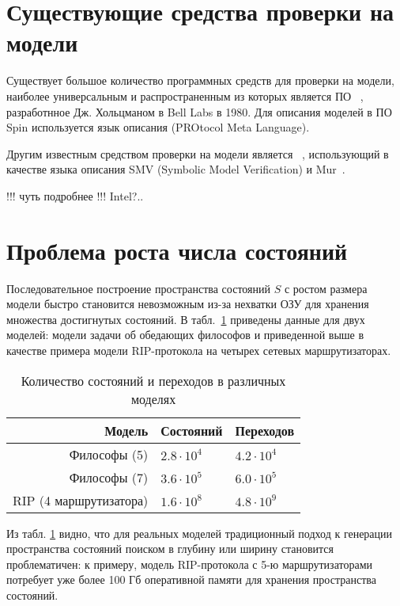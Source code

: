 \documentclass[a4paper,notitlepage,14pt]{article}
\begin{document}
\section{Существующие средства проверки на модели}
\label{sec:existing-tools}

Существует большое количество программных средств для проверки на модели, наиболее
универсальным и распространенным из которых является ПО ~\cite{SpinRoot},
разработнное Дж. Хольцманом в Bell Labs в 1980. Для описания моделей в ПО Spin
используется язык описания  (PROtocol Meta Language).

Другим известным средством проверки на модели является
~\cite{Cimatti00nusmv:a}, использующий в качестве языка описания SMV (Symbolic
Model Verification) и Mur\phi~\cite{Dill96murphi}.

!!! чуть подробнее
!!! Intel?..

\section{Проблема роста числа состояний}
\label{sec:state-explosion}

Последовательное построение пространства состояний $S$ с ростом размера модели быстро
становится невозможным из-за нехватки ОЗУ для хранения множества достигнутых состояний. В
табл.~\ref{tab:models-statecount} приведены данные для двух моделей: модели задачи об
обедающих философов и приведенной выше в качестве примера модели RIP-протокола на четырех
сетевых маршрутизаторах.

\begin{table}
  \centering
  \begin{tabular}{|r|l|l|}
    \hline
    Модель                  & Состояний         & Переходов       \\
    \hline
    Философы (5)            & $2.8 \cdot 10^4$  & $4.2 \cdot 10^4$ \\
    Философы (7)            & $3.6 \cdot 10^5$  & $6.0 \cdot 10^5$ \\
    RIP (4 маршрутизатора)  & $1.6 \cdot 10^8$  & $4.8 \cdot 10^9$ \\
    \hline
  \end{tabular}
  \caption{Количество состояний и переходов в различных моделях}
\label{tab:models-statecount}
\end{table}

Из табл. \ref{tab:models-statecount} видно, что для реальных моделей традиционный подход к
генерации пространства состояний поиском в глубину или ширину становится проблематичен: к
примеру, модель RIP-протокола с 5-ю маршрутизаторами потребует уже более 100 Гб
оперативной памяти для хранения пространства состояний.
\end{document}
